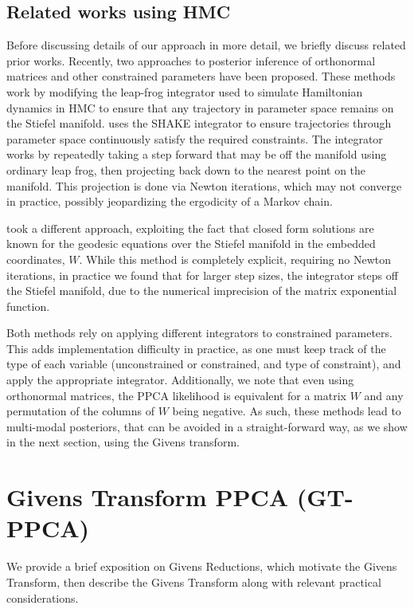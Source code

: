 \documentclass{article}
\begin{document}
\subsection{Related works using HMC}
Before discussing details of our approach in more detail, we briefly discuss related prior works.  Recently, two approaches to posterior inference of orthonormal matrices and other constrained parameters have been proposed. These methods work by modifying the leap-frog integrator used to simulate Hamiltonian dynamics in HMC to ensure that any trajectory in parameter space remains on the Stiefel manifold. \citet{brubaker2012family} uses the SHAKE integrator \citep{leimkuhler2004simulating} to ensure trajectories through parameter space continuously satisfy the required constraints. The integrator works by repeatedly taking a step forward that may be off the manifold using ordinary leap frog, then projecting back down to the nearest point on the manifold. This projection is done via Newton iterations, which may not converge in practice, possibly jeopardizing the ergodicity of a Markov chain.

\citet{byrne2013geodesic} took a different approach, exploiting the fact that closed form solutions are known for the geodesic equations over the Stiefel manifold in the embedded coordinates, $W$. While this method is completely explicit, requiring no Newton iterations, in practice we found that for larger step sizes, the integrator steps off the Stiefel manifold, due to the numerical imprecision of the matrix exponential function.

Both methods rely on applying different integrators to constrained parameters. This adds implementation difficulty in practice, as one must keep track of the type of each variable (unconstrained or constrained, and type of constraint), and apply the appropriate integrator. Additionally, we note that even using orthonormal matrices, the PPCA likelihood is equivalent for a matrix $W$ and any permutation of the columns of $W$ being negative. As such, these methods lead to multi-modal posteriors, that can be avoided in a straight-forward way, as we show in the next section, using the Givens transform.

\section{Givens Transform PPCA (GT-PPCA)} \label{Givens}
We provide a brief exposition on Givens Reductions, which motivate the Givens Transform, then describe the Givens Transform along with relevant practical considerations.
\end{document}
